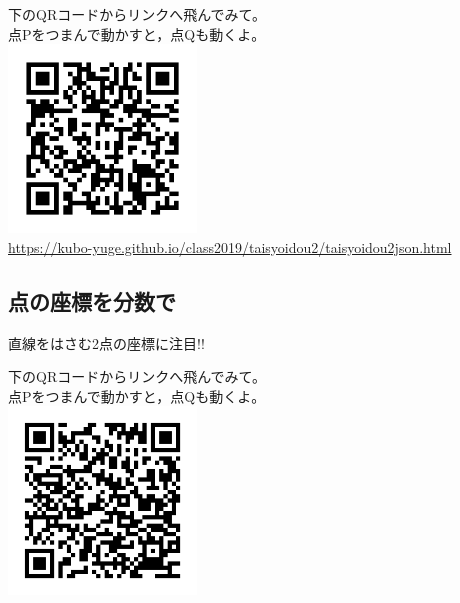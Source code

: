 \documentclass[uplatex,dvipdfmx,a4paper,twoside]{jsarticle}
\begin{document}
\begin{multicols}{2}
下のQRコードからリンクへ飛んでみて。\\
点Pをつまんで動かすと，点Qも動くよ。\\

\includegraphics[bb=18 18 170 170,width=50mm,clip]{対称移動2QR.png}\\

\url{https://kubo-yuge.github.io/class2019/taisyoidou2/taisyoidou2json.html}\\

\columnbreak

\subsection{点の座標を分数で}

直線をはさむ2点の座標に注目!!\par
\begin{layer}{80}{0}
\end{layer}\par
\vspace{15\baselineskip}

下のQRコードからリンクへ飛んでみて。\\
点Pをつまんで動かすと，点Qも動くよ。\\

\includegraphics[bb=18 18 185 185,width=50mm,clip]{対称移動3QR.png}\\


\end{multicols}
\end{document}
